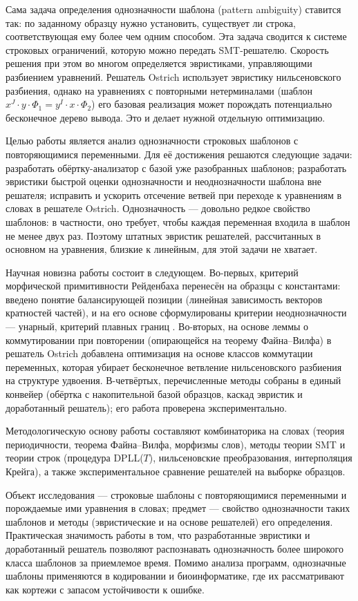 \documentclass[14pt, russian]{scrartcl}
\begin{document}
Сама задача определения однозначности шаблона (pattern ambiguity) ставится так:
по заданному образцу нужно установить, существует ли строка, соответствующая ему
более чем одним способом. Эта задача сводится к системе строковых ограничений,
которую можно передать SMT-решателю. Скорость решения при этом во многом
определяется эвристиками, управляющими разбиением уравнений. Решатель Ostrich
использует эвристику нильсеновского разбиения, однако на уравнениях с повторными 
нетерминалами (шаблон $x^J\cdot y\cdot\Phi_1 = y^I\cdot x\cdot\Phi_2$) его базовая
реализация может порождать потенциально бесконечное дерево вывода. Это и делает
нужной отдельную оптимизацию.

Целью работы является анализ однозначности строковых шаблонов с
повторяющимися переменными. Для её достижения решаются следующие задачи:
разработать обёртку-анализатор с базой уже разобранных шаблонов; разработать
эвристики быстрой оценки однозначности и неоднозначности шаблона вне решателя;
исправить и ускорить отсечение ветвей при переходе к уравнениям в словах в
решателе Ostrich. Однозначность --- довольно редкое свойство шаблонов: в
частности, оно требует, чтобы каждая переменная входила в шаблон не менее двух
раз. Поэтому штатных эвристик решателей, рассчитанных в основном на уравнения,
близкие к линейным, для этой задачи не хватает.

Научная новизна работы состоит в следующем. Во-первых, критерий морфической
примитивности Рейденбаха перенесён на образцы с константами: введено понятие
балансирующей позиции (линейная зависимость векторов кратностей частей), и на его
основе сформулированы критерии неоднозначности --- унарный, критерий плавных 
границ . Во-вторых, на основе леммы о коммутировании при повторении
(опирающейся на теорему Файна--Вилфа) в
решатель Ostrich добавлена оптимизация на основе классов коммутации переменных,
которая убирает бесконечное ветвление нильсеновского разбиения на структуре
удвоения. В-четвёртых, перечисленные методы собраны в единый конвейер (обёртка с
накопительной базой образцов, каскад эвристик и доработанный решатель); его работа
проверена экспериментально.

Методологическую основу работы составляют комбинаторика на словах (теория
периодичности, теорема Файна--Вилфа, морфизмы слов), методы теории SMT и теории
строк (процедура DPLL($T$), нильсеновские преобразования, интерполяция Крейга), а
также экспериментальное сравнение решателей на выборке образцов.

Объект исследования --- строковые шаблоны с повторяющимися переменными и
порождаемые ими уравнения в словах; предмет --- свойство однозначности таких
шаблонов и методы (эвристические и на основе решателей) его определения.
Практическая значимость работы в том, что разработанные эвристики и доработанный
решатель позволяют распознавать однозначность более широкого класса шаблонов за
приемлемое время. Помимо анализа программ, однозначные шаблоны применяются в
кодировании и биоинформатике, где их рассматривают как кортежи с запасом
устойчивости к ошибке.
\end{document}
